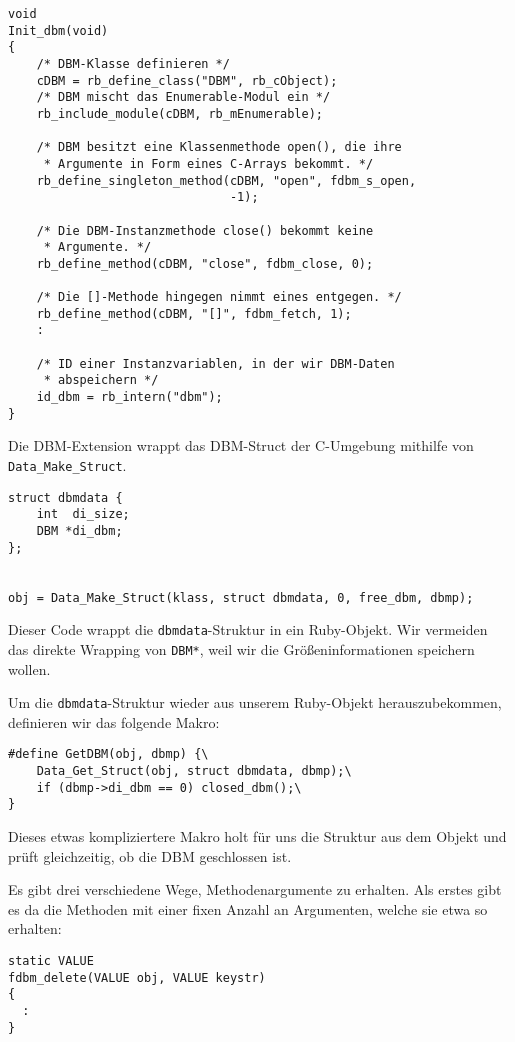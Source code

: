 \begin{lstlisting}
void
Init_dbm(void)
{
    /* DBM-Klasse definieren */
    cDBM = rb_define_class("DBM", rb_cObject);
    /* DBM mischt das Enumerable-Modul ein */
    rb_include_module(cDBM, rb_mEnumerable);

    /* DBM besitzt eine Klassenmethode open(), die ihre
     * Argumente in Form eines C-Arrays bekommt. */
    rb_define_singleton_method(cDBM, "open", fdbm_s_open,
                               -1);

    /* Die DBM-Instanzmethode close() bekommt keine
     * Argumente. */
    rb_define_method(cDBM, "close", fdbm_close, 0);

    /* Die []-Methode hingegen nimmt eines entgegen. */
    rb_define_method(cDBM, "[]", fdbm_fetch, 1);
    :

    /* ID einer Instanzvariablen, in der wir DBM-Daten
     * abspeichern */
    id_dbm = rb_intern("dbm");
}
\end{lstlisting}

Die DBM-Extension wrappt das DBM-Struct der C-Umgebung mithilfe von
\verb+Data_Make_Struct+.

\begin{lstlisting}
struct dbmdata {
    int  di_size;
    DBM *di_dbm;
};


obj = Data_Make_Struct(klass, struct dbmdata, 0, free_dbm, dbmp);
\end{lstlisting}

\noindent Dieser Code wrappt die \verb+dbmdata+-Struk\-tur in ein
Ruby-Objekt. Wir vermeiden das direkte Wrapping von \verb+DBM*+, weil
wir die Größeninformationen speichern wollen.

Um die \verb+dbmdata+-Struktur wieder aus unserem Ruby-Objekt
herauszubekommen, definieren wir das folgende Makro:

\begin{lstlisting}
#define GetDBM(obj, dbmp) {\
    Data_Get_Struct(obj, struct dbmdata, dbmp);\
    if (dbmp->di_dbm == 0) closed_dbm();\
}
\end{lstlisting}

\noindent Dieses etwas kompliziertere Makro holt für uns die Struktur
aus dem Objekt und prüft gleichzeitig, ob die DBM geschlossen ist.

Es gibt drei verschiedene Wege, Methodenargumente zu erhalten. Als
erstes gibt es da die Methoden mit einer fixen Anzahl an Argumenten,
welche sie etwa so erhalten:

\begin{lstlisting}
static VALUE
fdbm_delete(VALUE obj, VALUE keystr)
{
  :
}
\end{lstlisting}

